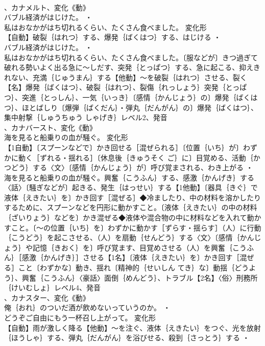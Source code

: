 \documentclass[8pt]{extreport}
\begin{document}
\begin{CJK}{UTF8}{min}
\\	、カナメルト、変化《動》
\\	バブル経済がはじけた。 ・
\\	私はおなかがはち切れるくらい、たくさん食べました。	変化形 
\\	【自動】破裂｛はれつ｝する、爆発｛ばくはつ｝する、はじける ・
\\	バブル経済がはじけた。 ・
\\	私はおなかがはち切れるくらい、たくさん食べました。〔服などが〕きつ過ぎて破れる勢いよく出る急に～しだす、突発｛とっぱつ｝する、急に起こる、抑えきれない、充満｛じゅうまん｝する【他動】～を破裂｛はれつ｝させる、裂く【名】爆発｛ばくはつ｝、破裂｛はれつ｝、裂傷｛れっしょう｝突発｛とっぱつ｝、突進｛とっしん｝、一気｛いっき｝〔感情｛かんじょう｝の〕爆発｛ばくはつ｝、ほとばしり〔爆弾｛ばくだん｝・弾丸｛だんがん｝の〕爆発｛ばくはつ｝、集中射撃｛しゅうちゅう しゃげき｝レベル2、発音
\\	、カナバースト、変化《動》
\\	海を見ると船乗りの血が騒ぐ。	変化形 
\\	【1自動】〔スプーンなどで〕かき回せる［混ぜられる］〔位置｛いち｝が〕わずかに動く［ずれる・揺れる］〔休息後｛きゅうそく ご｝に〕目覚める、活動｛かつどう｝する〈文〉〔感情｛かんじょう｝が〕呼び覚まされる、わき上がる ・
\\	海を見ると船乗りの血が騒ぐ。興奮｛こうふん｝する、感激｛かんげき｝する〈話〉〔騒ぎなどが〕起きる、発生｛はっせい｝する【1他動】〔器具｛きぐ｝で液体｛えきたい｝を〕かき回す［混ぜる］◆冷ましたり、中の材料を溶かしたりするために、スプーンなどを円形に動かすこと。〔液体｛えきたい｝の中の材料｛ざいりょう｝などを〕かき混ぜる◆液体や混合物の中に材料などを入れて動かすこと。〔～の位置｛いち｝を〕わずかに動かす［ずらす・揺らす］（人）に行動｛こうどう｝を起こさせる、（人）を扇動｛せんどう｝する〈文〉〔感情｛かんじょう｝や記憶｛きおく｝を〕呼び覚ます、目覚めさせる（人）を興奮｛こうふん｝［感激｛かんげき｝］させる【1名】〔液体｛えきたい｝を〕かき回す［混ぜる］こと〔わずかな〕動き、揺れ〔精神的｛せいしん てき｝な〕動揺｛どうよう｝、興奮｛こうふん｝〈豪話〉面倒｛めんどう｝、トラブル【2名】〈俗〉刑務所｛けいむしょ｝レベル4、発音
\\	、カナスター、変化《動》
\\	俺｛おれ｝のついだ酒が飲めないっていうのか。 ・
\\	どうぞご自由にもう一杯召し上がって。	変化形 
\\	【自動】雨が激しく降る【他動】～を注ぐ、液体｛えきたい｝をつぐ、光を放射｛ほうしゃ｝する、弾丸｛だんがん｝を浴びせる、殺到｛さっとう｝する ・

\end{CJK}
\end{document}
